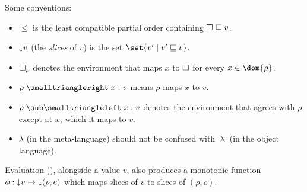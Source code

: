 

Some conventions:
\begin{itemize}
\item $\leq$ is the least compatible partial order containing $\square \sqsubseteq v$.
\item ${\downarrow}{v}$ (the \emph{slices} of $v$) is the set $\set{v' \mid v' \leq v}$.
\item $\square_\rho$ denotes the environment that maps $x$ to $\square$ for every $x \in \dom{\rho}$.
\item $\envLookup{\rho}{x}{v}$ means $\rho$ maps $x$ to $v$.
\item $\envLookupBwd{\rho}{}{\bind{x}{v}}$ denotes the environment that agrees with $\rho$ except at $x$, which it maps to $v$.
\item $\lambda$ (in the meta-language) should not be confused with $\uplambda$ (in the object language).
\end{itemize}

\noindent Evaluation (), alongside a value $v$, also produces a monotonic function $\phi: {\downarrow}{v} \to {\downarrow}{(\rho,e)}$ which maps slices of $v$ to slices of $(\rho,e)$.


